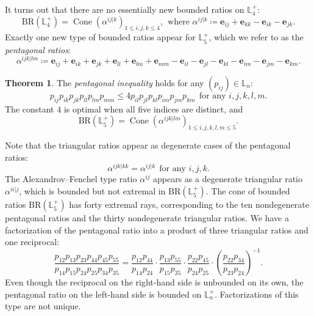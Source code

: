 \documentclass{amsart}
\theoremstyle{definition}
\newtheorem{mainthm}{Theorem}
\theoremstyle{remark}
\def\L{\mathbb{L}}
\def\BR{\mathrm{BR}}
\begin{document}
It turns out that there are no essentially new bounded ratios on $\L_4^+$:
\[
\BR(\L^+_4)=\operatorname{Cone}(\alpha^{ij|k})_{1 \le i,j,k \le 4}, \ \ \text{where $\alpha^{ij|k} \coloneq \mathbf{e}_{ij}+\mathbf{e}_{kk}-\mathbf{e}_{ik}-\mathbf{e}_{jk}$.}
\]
Exactly one new type of bounded ratios appear for $\L_5^+$, which we refer to as the \emph{pentagonal ratios}:
\[
\alpha^{ijk|lm}\coloneq \mathbf{e}_{ij}+\mathbf{e}_{ik}+\mathbf{e}_{jk}+\mathbf{e}_{ll}+\mathbf{e}_{lm}+\mathbf{e}_{mm}-\mathbf{e}_{il}-\mathbf{e}_{jl}-\mathbf{e}_{kl}-\mathbf{e}_{im}-\mathbf{e}_{jm}-\mathbf{e}_{km}.
\]



\renewcommand{\themainthm}{A}
 
\begin{mainthm}
\label{mth:pentagonal}
The \emph{pentagonal inequality} holds for any $(p_{ij}) \in \L_n$:
\[
p_{ij}p_{ik}p_{jk}p_{ll}p_{lm}p_{mm} \le 4 p_{il}p_{jl}p_{kl}p_{im}p_{jm}p_{km} \ \ \text{for any $i,j,k,l,m$.}
\]
The constant $4$ is optimal when all five indices are distinct, and
    \[
\BR(\L_5^+)=\operatorname{Cone}(\alpha^{ijk|lm})_{1 \le i,j,k,l,m \le 5}.
    \]
\end{mainthm} 

Note that the triangular ratios appear as degenerate cases of the pentagonal ratios:
\[
\alpha^{ijk|kk} = \alpha^{ij|k} \ \ \text{for any $i,j,k$.}
\]
The Alexandrov--Fenchel type ratio $\alpha^{ij}$ appears as a degenerate triangular ratio $\alpha^{ii|j}$, which is bounded but not extremal in $\BR(\L_5^+)$.
The cone of bounded ratios $\BR(\L_5^+)$ has forty extremal rays, corresponding to the ten nondegenerate pentagonal ratios and the thirty nondegenerate triangular ratios.
We have a factorization of the pentagonal ratio  into a product of three  triangular ratios and one reciprocal:
\[
\frac{p_{12}p_{13}p_{23}p_{44}p_{45}p_{55}}{p_{14}p_{15}p_{24}p_{25}p_{34}p_{35}} = \frac{p_{12}p_{44}}{p_{14}p_{24}}\cdot\frac{p_{13}p_{55}}{p_{15}p_{35}}\cdot\frac{p_{22}p_{45}}{p_{24}p_{25}}\cdot\left(\frac{p_{22}p_{34}}{p_{23}p_{24}}\right)^{-1}.
\]
 Even though the reciprocal on the right-hand side is unbounded  on its own, the pentagonal ratio on the left-hand side is bounded on $\L_n^+$. Factorizations of this type are not unique. 
\end{document}
